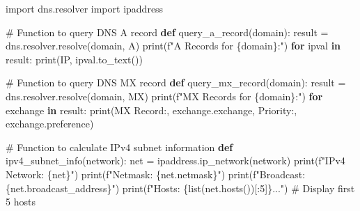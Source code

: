 \documentclass[
  letterpaper,
  DIV=11,
  numbers=noendperiod]{scrreprt}
\newenvironment{Shaded}{\begin{snugshade}}{\end{snugshade}}
\newcommand{\BuiltInTok}[1]{\textcolor[rgb]{0.00,0.23,0.31}{#1}}
\newcommand{\CommentTok}[1]{\textcolor[rgb]{0.37,0.37,0.37}{#1}}
\newcommand{\ControlFlowTok}[1]{\textcolor[rgb]{0.00,0.23,0.31}{\textbf{#1}}}
\newcommand{\DecValTok}[1]{\textcolor[rgb]{0.68,0.00,0.00}{#1}}
\newcommand{\ImportTok}[1]{\textcolor[rgb]{0.00,0.46,0.62}{#1}}
\newcommand{\KeywordTok}[1]{\textcolor[rgb]{0.00,0.23,0.31}{\textbf{#1}}}
\newcommand{\NormalTok}[1]{\textcolor[rgb]{0.00,0.23,0.31}{#1}}
\newcommand{\OperatorTok}[1]{\textcolor[rgb]{0.37,0.37,0.37}{#1}}
\newcommand{\SpecialCharTok}[1]{\textcolor[rgb]{0.37,0.37,0.37}{#1}}
\newcommand{\SpecialStringTok}[1]{\textcolor[rgb]{0.13,0.47,0.30}{#1}}
\newcommand{\StringTok}[1]{\textcolor[rgb]{0.13,0.47,0.30}{#1}}
\begin{document}
\begin{Shaded}
\begin{Highlighting}[]
\ImportTok{import}\NormalTok{ dns.resolver}
\ImportTok{import}\NormalTok{ ipaddress}

\CommentTok{\# Function to query DNS A record}
\KeywordTok{def}\NormalTok{ query\_a\_record(domain):}
\NormalTok{    result }\OperatorTok{=}\NormalTok{ dns.resolver.resolve(domain, }\StringTok{\textquotesingle{}A\textquotesingle{}}\NormalTok{)}
    \BuiltInTok{print}\NormalTok{(}\SpecialStringTok{f"A Records for }\SpecialCharTok{\{}\NormalTok{domain}\SpecialCharTok{\}}\SpecialStringTok{:"}\NormalTok{)}
    \ControlFlowTok{for}\NormalTok{ ipval }\KeywordTok{in}\NormalTok{ result:}
        \BuiltInTok{print}\NormalTok{(}\StringTok{\textquotesingle{}IP\textquotesingle{}}\NormalTok{, ipval.to\_text())}

\CommentTok{\# Function to query DNS MX record}
\KeywordTok{def}\NormalTok{ query\_mx\_record(domain):}
\NormalTok{    result }\OperatorTok{=}\NormalTok{ dns.resolver.resolve(domain, }\StringTok{\textquotesingle{}MX\textquotesingle{}}\NormalTok{)}
    \BuiltInTok{print}\NormalTok{(}\SpecialStringTok{f"MX Records for }\SpecialCharTok{\{}\NormalTok{domain}\SpecialCharTok{\}}\SpecialStringTok{:"}\NormalTok{)}
    \ControlFlowTok{for}\NormalTok{ exchange }\KeywordTok{in}\NormalTok{ result:}
        \BuiltInTok{print}\NormalTok{(}\StringTok{\textquotesingle{}MX Record:\textquotesingle{}}\NormalTok{, exchange.exchange, }\StringTok{\textquotesingle{}Priority:\textquotesingle{}}\NormalTok{, exchange.preference)}

\CommentTok{\# Function to calculate IPv4 subnet information}
\KeywordTok{def}\NormalTok{ ipv4\_subnet\_info(network):}
\NormalTok{    net }\OperatorTok{=}\NormalTok{ ipaddress.ip\_network(network)}
    \BuiltInTok{print}\NormalTok{(}\SpecialStringTok{f"IPv4 Network: }\SpecialCharTok{\{}\NormalTok{net}\SpecialCharTok{\}}\SpecialStringTok{"}\NormalTok{)}
    \BuiltInTok{print}\NormalTok{(}\SpecialStringTok{f"Netmask: }\SpecialCharTok{\{}\NormalTok{net}\SpecialCharTok{.}\NormalTok{netmask}\SpecialCharTok{\}}\SpecialStringTok{"}\NormalTok{)}
    \BuiltInTok{print}\NormalTok{(}\SpecialStringTok{f"Broadcast: }\SpecialCharTok{\{}\NormalTok{net}\SpecialCharTok{.}\NormalTok{broadcast\_address}\SpecialCharTok{\}}\SpecialStringTok{"}\NormalTok{)}
    \BuiltInTok{print}\NormalTok{(}\SpecialStringTok{f"Hosts: }\SpecialCharTok{\{}\BuiltInTok{list}\NormalTok{(net.hosts())[:}\DecValTok{5}\NormalTok{]}\SpecialCharTok{\}}\SpecialStringTok{..."}\NormalTok{)  }\CommentTok{\# Display first 5 hosts}


\end{Highlighting}
\end{Shaded}
\end{document}
